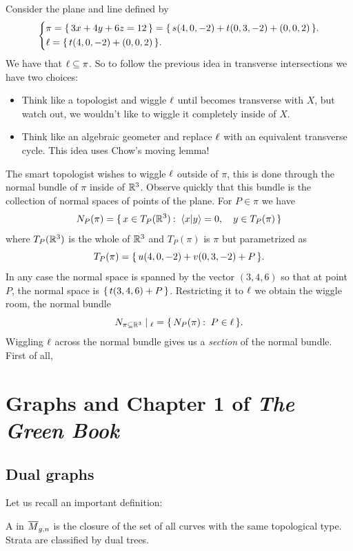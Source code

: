 \documentclass[12pt]{memoir}
\begin{document}
\begin{Ex}
    Consider the plane and line defined by 
    $$
    \left\lbrace
    \begin{aligned}
    &\pi=\{\,3x+4y+6z=12\,\}=\{\,s(4,0,-2)+t(0,3,-2)+(0,0,2)\,\}.\\
    &\ell=\{\,t(4,0,-2)+(0,0,2)\,\}.
    \end{aligned}
    \right.
    $$
    We have that $\ell\subseteq\pi$. So to follow the previous idea in transverse intersections we have two choices:
    \begin{itemize}
        \item Think like a topologist and wiggle $\ell$ until becomes transverse with $X$, but watch out, we wouldn't like to wiggle it completely inside of $X$.
        \item Think like an algebraic geometer and replace $\ell$ with an equivalent transverse cycle. This idea uses Chow's moving lemma!
    \end{itemize}
    The smart topologist wishes to wiggle $\ell$ outside of $\pi$, this is done through the normal bundle of $\pi$ inside of $\mathbb{R}^3$. Observe quickly that this bundle is the collection of normal spaces of points of the plane. For $P\in\pi$ we have
    $$N_P(\pi)=\set{x\in T_P(\bR^3)\:\ \braket{x}{y}=0,\quad y\in T_P(\pi)}$$
    where $T_P(\mathbb{R}^3)$ is the whole of $\mathbb{R}^3$ and $T_P(\pi)$ is $\pi$ but parametrized as 
    $$T_P(\pi)=\{\,u(4,0,-2)+v(0,3,-2)+P\,\}.$$
    In any case the normal space is spanned by the vector $(3,4,6)$ so that at point $P$, the normal space is $\{\,t(3,4,6)+P\,\}$. Restricting it to $\ell$ we obtain the wiggle room, the normal bundle 
    $$N_{\pi\subseteq\bR^3}\mid_{\l}=\set{N_P(\pi)\:\ P\in\l}.$$
    Wiggling $\ell$ across the normal bundle gives us a \emph{section} of the normal bundle. First of all, 
\end{Ex}

\chapter{Graphs and Chapter 1 of \emph{The Green Book}}

\section{Dual graphs}

Let us recall an important definition:

\begin{Def}
    A  in $\overline{M}_{g,n}$ is the closure of the set of all curves with the same topological type. Strata are classified by dual trees. 
\end{Def}
\end{document}
